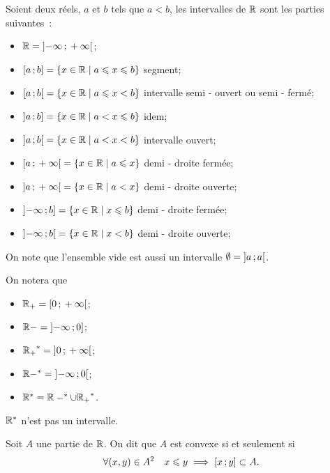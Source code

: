 \begin{defdef}
  Soient deux réels, \(a\) et \(b\) tels que \(a<b\), les intervalles de \(\mathbb{R}\) 
  sont les parties suivantes~:
  \begin{itemize}
    \item \(\mathbb{R} = \left]  - \infty \, ; {}  + \infty \right[\);
    \item \(\left[ a \, ; {} b \right] = \left\{x \in \mathbb{R}\mathrel{}\middle|\mathrel{}a\leqslant x \leqslant b\right\}\) 
      segment;
    \item \(\left[ a \, ; {} b \right[ = \left\{x \in \mathbb{R}\mathrel{}\middle|\mathrel{}a\leqslant x < b\right\}\) 
      intervalle semi - ouvert ou semi - fermé;
    \item \(\left] a \, ; {} b \right] = \left\{x \in \mathbb{R}\mathrel{}\middle|\mathrel{}a< x \leqslant b\right\}\) idem;
    \item \(\left] a \, ; {} b \right[ = \left\{x \in \mathbb{R}\mathrel{}\middle|\mathrel{}a< x < b\right\}\) intervalle 
      ouvert;
    \item \(\left[ a \, ; {}  + \infty \right[ = \left\{x \in \mathbb{R}\mathrel{}\middle|\mathrel{}a\leqslant x\right\}\) demi 
      - droite fermée;
    \item \(\left] a \, ; {}  + \infty \right[ = \left\{x \in \mathbb{R}\mathrel{}\middle|\mathrel{}a< x\right\}\) demi - droite 
      ouverte;
    \item \(\left]  - \infty \, ; {} b \right] = \left\{x \in \mathbb{R}\mathrel{}\middle|\mathrel{}x \leqslant b\right\}\) demi 
      - droite fermée;
    \item \(\left]  - \infty \, ; {} b \right[ = \left\{x \in \mathbb{R}\mathrel{}\middle|\mathrel{}x <b\right\}\) demi - droite 
      ouverte;
  \end{itemize}
\end{defdef}
On note que l'ensemble vide est aussi un intervalle \(\emptyset = 
\left] a \, ; {} a \right[\).
\begin{defdef}
  On notera que
  \begin{itemize}
    \item \(\mathbb{R}_{+} = \left[ 0 \, ; {}  + \infty \right[\);
    \item \(\mathbb{R}- = \left]  - \infty \, ; {} 0 \right]\);
    \item \({\mathbb{R}_{+}}^* = \left] 0 \, ; {}  + \infty \right[\);
    \item \(\mathbb{R} - ^* = \left]  - \infty \, ; {} 0 \right[\);
    \item \(\mathbb{R}^* = \mathbb{R} - ^* \cup {\mathbb{R}_{+}}^*\).
  \end{itemize}
  \(\mathbb{R}^*\) n'est pas un intervalle.
\end{defdef}
\begin{defdef}
  Soit \(A\) une partie de \(\mathbb{R}\). On dit que \(A\) est convexe si et seulement 
  si
  \begin{equation}
    \forall (x, y) \in A^2 \quad x\leqslant y \implies 
    \left[ x \, ; {} y \right]\subset A.
  \end{equation}
\end{defdef}

